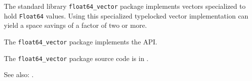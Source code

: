 
The standard library {\tt float64\_vector} package implements vectors specialized to hold 
{\tt Float64} values.  Using this specialized typelocked vector implementation can 
yield a space savings of a factor of two or more.

The {\tt float64\_vector} package implements the  API.

The {\tt float64\_vector} package source code is in .

See also:   .


